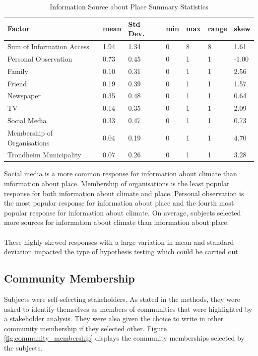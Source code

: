 \begin{center}
\begin{table}[H]
    \centering
    \begin{tabular}{|l|l|l|l|l|l|l|}
    \hline
         \textbf{Factor} & \textbf{mean} & \textbf{Std Dev.} & \textbf{min} & \textbf{max} & \textbf{range} & \textbf{skew}  \\ \hline
        Sum of Information Access & 1.94 & 1.34 & 0 & 8 & 8 & 1.61 \\ \hline
        Personal Observation & 0.73 & 0.45 & 0 & 1 & 1 & -1.00  \\ \hline
        Family & 0.10 & 0.31 & 0 & 1 & 1 & 2.56 \\ \hline
        Friend & 0.19 & 0.39 & 0 & 1 & 1 & 1.57  \\ \hline
        Newspaper & 0.35 & 0.48 & 0 & 1 & 1 & 0.64  \\ \hline
        TV & 0.14 & 0.35 & 0 & 1 & 1 & 2.09 \\ \hline
       Social Media & 0.33 & 0.47 & 0 & 1 & 1 & 0.73  \\ \hline
        Membership of Organisations & 0.04 & 0.19 & 0 & 1 & 1 & 4.70 \\ \hline
        Trondheim Municipality & 0.07 & 0.26 & 0 & 1 & 1 & 3.28\\ \hline
                
         \end{tabular}
    \caption{Information Source about Place Summary Statistics}{}
\label{table:sum_stats_info__place_access}
\end{table}
\end{center}

Social media is a more common response for information about climate than information about place. Membership of organisations is the least popular response for both information about climate and place. Personal observation is the most popular response for information about place and the fourth most popular response for information about climate. On average, subjects selected more sources for information about climate than information about place. 
\paragraph{}
These highly skewed responses with a large variation in mean and standard deviation impacted the type of hypothesis testing which could be carried out.  

\subsection{Community Membership}
Subjects were self-selecting stakeholders.  As stated in the methods, they were asked to identify themselves as members of communities that were highlighted by a stakeholder analysis. They were also given the choice to write in other community membership if they selected other. Figure \ref{fig:community_membership} displays the community memberships selected by the subjects. 

